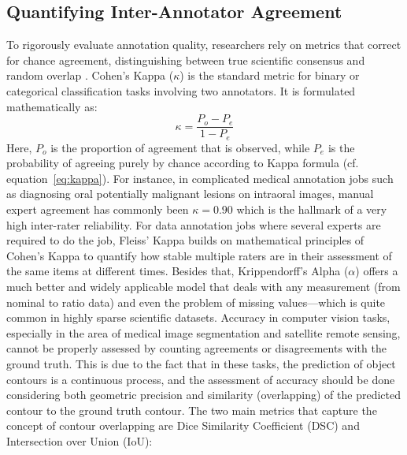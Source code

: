 \documentclass[10pt, conference, letterpaper]{IEEEtran}
\begin{document}
\subsection{Quantifying Inter-Annotator Agreement}
To rigorously evaluate annotation quality, researchers rely on metrics that correct for chance agreement, distinguishing between true scientific consensus and random overlap \cite{ref3}. Cohen's Kappa ($\kappa$) is the standard metric for binary or categorical classification tasks involving two annotators. It is formulated mathematically as:
\begin{equation}
\kappa = \frac{P_o - P_e}{1-P_e}
\label{eq:kappa}
\end{equation}
Here, $P_o$ is the proportion of agreement that is observed, while $P_e$ is the probability of agreeing purely by chance according to Kappa formula (cf. equation~\eqref{eq:kappa}). For instance, in complicated medical annotation jobs such as diagnosing oral potentially malignant lesions on intraoral images, manual expert agreement has commonly been $\kappa = 0.90$ which is the hallmark of a very high inter-rater reliability.
For data annotation jobs where several experts are required to do the job, Fleiss' Kappa builds on mathematical principles of Cohen's Kappa to quantify how stable multiple raters are in their assessment of the same items at different times. Besides that, Krippendorff's Alpha ($\alpha$) offers a much better and widely applicable model that deals with any measurement (from nominal to ratio data) and even the problem of missing values---which is quite common in highly sparse scientific datasets.
Accuracy in computer vision tasks, especially in the area of medical image segmentation and satellite remote sensing, cannot be properly assessed by counting agreements or disagreements with the ground truth. This is due to the fact that in these tasks, the prediction of object contours is a continuous process, and the assessment of accuracy should be done considering both geometric precision and similarity (overlapping) of the predicted contour to the ground truth contour. The two main metrics that capture the concept of contour overlapping are Dice Similarity Coefficient (DSC) and Intersection over Union (IoU):
\end{document}

